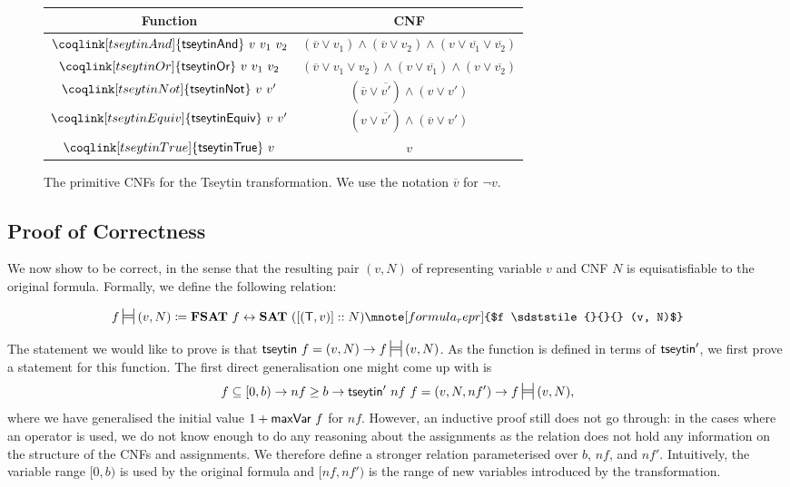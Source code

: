\begin{figure}
  \begin{center}
    \begin{tabular}{c|c} 
      Function & CNF \\
      \midrule{}
      $\coqlink[tseytinAnd]{\textsf{tseytinAnd}}~v~v_1~v_2$ & $(\overline{v} \lor v_1) \land (\overline{v} \lor v_2) \land (v \lor \overline{v_1} \lor \overline{v_2})$ \\
      $\coqlink[tseytinOr]{\textsf{tseytinOr}}~v~v_1~v_2$ & $(\overline{v} \lor v_1 \lor v_2) \land (v \lor \overline{v_1}) \land (v \lor \overline{v_2})$ \\
      $\coqlink[tseytinNot]{\textsf{tseytinNot}}~v~v'$ & $(\overline{v} \lor \overline{v'}) \land (v \lor v')$ \\
      $\coqlink[tseytinEquiv]{\textsf{tseytinEquiv}}~v~v'$ & $(v \lor \overline{v'}) \land (\overline{v} \lor v')$ \\
      $\coqlink[tseytinTrue]{\textsf{tseytinTrue}}~v$ & $v$ 
    \end{tabular}
  \end{center}
  \caption{The primitive CNFs for the Tseytin transformation. We use the notation $\overline{v}$ for $\lnot v$.}\label{fig:prim_cnfs}
\end{figure}

\subsection{Proof of Correctness}
We now show \tseytin{} to be correct, in the sense that the resulting pair $(v, N)$ of representing variable $v$ and CNF $N$ is equisatisfiable to the original formula. Formally, we define the following relation:
\newcommand{\frepr}{\sdststile{}{}}
\begin{definition}
  \[ f \frepr{} (v, N) \defeq \fsat{}~f \leftrightarrow \SAT{}~([(\btrue, v)] :: N) \mnote[formula_repr]{$f \frepr{} (v, N)$}\]
\end{definition}

The statement we would like to prove is that $\tseytin~f = (v, N) \rightarrow f \frepr{} (v, N)$. As the function is defined in terms of $\textsf{tseytin}'$, we first prove a statement for this function. The first direct generalisation one might come up with is
\[f \subseteq [0, b) \rightarrow nf \ge b \rightarrow \tseytin'~nf~f = (v, N, nf') \rightarrow f \frepr{} (v, N), \]
where we have generalised the initial value $1 +{\textsf{maxVar}~f}$ for $nf$.
However, an inductive proof still does not go through: in the cases where an operator is used, we do not know enough to do any reasoning about the assignments as the relation does not hold any information on the structure of the CNFs and assignments. 
We therefore define a stronger relation parameterised over $b$, $nf$, and $nf'$. Intuitively, the variable range $[0, b)$ is used by the original formula and $[nf, nf')$ is the range of new variables introduced by the transformation.

